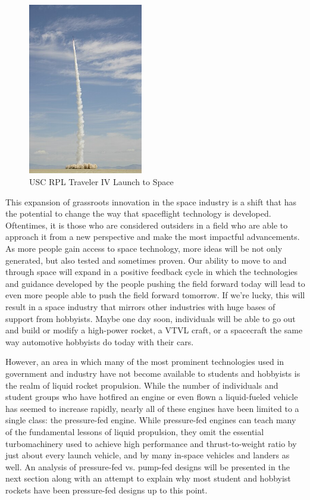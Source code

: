 \documentclass[12pt, letterpaper]{article}
\begin{document}
\begin{figure}
    \centering
    \includegraphics[width=5cm]{Images/Kluft-photo-CSXT-2004-amateur-space-launch.jpg}
    \caption{USC RPL Traveler IV Launch to Space}
\end{figure}

    
\newpage

This expansion of grassroots innovation in the space industry is a shift that has the potential to change the way that spaceflight technology is developed. Oftentimes, it is those who are considered outsiders in a field who are able to approach it from a new perspective and make the most impactful advancements. As more people gain access to space technology, more ideas will be not only generated, but also tested and sometimes proven. Our ability to move to and through space will expand in a positive feedback cycle in which the technologies and guidance developed by the people pushing the field forward today will lead to even more people able to push the field forward tomorrow. If we're lucky, this will result in a space industry that mirrors other industries with huge bases of support from hobbyists. Maybe one day soon, individuals will be able to go out and build or modify a high-power rocket, a VTVL craft, or a spacecraft the same way automotive hobbyists do today with their cars.

However, an area in which many of the most prominent technologies used in government and industry have not become available to students and hobbyists is the realm of liquid rocket propulsion. While the number of individuals and student groups who have hotfired an engine or even flown a liquid-fueled vehicle has seemed to increase rapidly, nearly all of these engines have been limited to a single class: the pressure-fed engine. While pressure-fed engines can teach many of the fundamental lessons of liquid propulsion, they omit the essential turbomachinery used to achieve high performance and thrust-to-weight ratio by just about every launch vehicle, and by many in-space vehicles and landers as well. An analysis of pressure-fed vs. pump-fed designs will be presented in the next section along with an attempt to explain why most student and hobbyist rockets have been pressure-fed designs up to this point.
\end{document}

